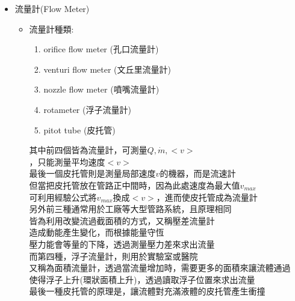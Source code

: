 \documentclass[../main.tex]{subfiles}
\begin{document}
\begin{itemize}
\begin{itemize}
    這件事有點反直覺，要特別注意
    \item $\text{NPSH}_A$ (Net Positive Suction Head Actual)\\
    實際NPSH
    \item $\text{NPSH}_R$ (Net Positive Suction Head Required)\\
    泵浦廠商所提供的最小NPSH需求值
    \item 為了避免空蝕，需滿足
    \begin{equation}
      \text{NPSH}_A > \text{NPSH}_R
    \end{equation}
    而不只是大於0即可
  \end{itemize}
  \item 流量計(Flow Meter)
  \begin{itemize}
    \item 流量計種類:
    \begin{enumerate}
      \item orifice flow meter (孔口流量計)
      \item venturi flow meter (文丘里流量計)
      \item nozzle flow meter (噴嘴流量計)
      \item rotameter (浮子流量計)
      \item pitot tube (皮托管)
    \end{enumerate}
    其中前四個皆為流量計，可測量$Q, \dot m, <v>$\\
    ，只能測量平均速度$<v>$\\
    最後一個皮托管則是測量局部速度$v$的機器，而是流速計\\
    但當把皮托管放在管路正中間時，因為此處速度為最大值$v_{max}$\\
    可利用經驗公式將$v_{max}$換成$<v>$，進而使皮托管成為流量計\bigskip\\
    另外前三種通常用於工廠等大型管路系統，且原理相同\\
    皆為利用改變流過截面積的方式，又稱壓差流量計\\
    造成動能產生變化，而根據能量守恆\\
    壓力能會等量的下降，透過測量壓力差來求出流量\bigskip\\
    而第四種，浮子流量計，則用於實驗室或醫院\\
    又稱為面積流量計，透過當流量增加時，需要更多的面積來讓流體通過\\
    使得浮子上升(環狀面積上升)，透過讀取浮子位置來求出流量\bigskip\\
    最後一種皮托管的原理是，讓流體對充滿液體的皮托管產生衝撞\\

\end{itemize}
\end{itemize}
\end{document}

